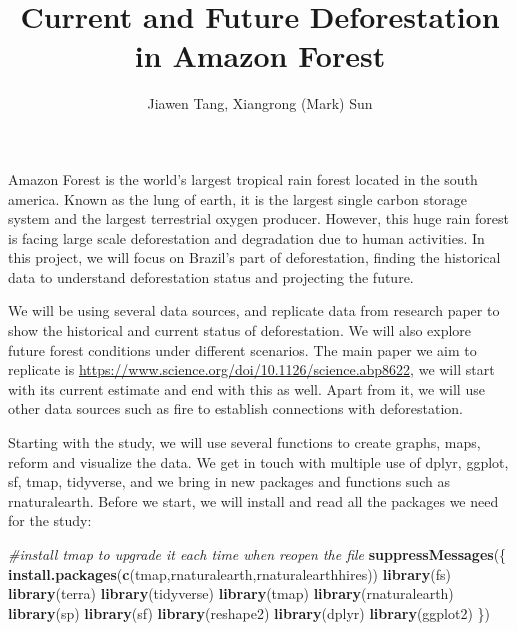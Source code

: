 \documentclass[
]{article}
\title{Current and Future Deforestation in Amazon Forest}
\author{Jiawen Tang, Xiangrong (Mark) Sun}
\date{}
\newenvironment{Shaded}{\begin{snugshade}}{\end{snugshade}}
\newcommand{\CommentTok}[1]{\textcolor[rgb]{0.56,0.35,0.01}{\textit{#1}}}
\newcommand{\FunctionTok}[1]{\textcolor[rgb]{0.13,0.29,0.53}{\textbf{#1}}}
\newcommand{\NormalTok}[1]{#1}
\newcommand{\StringTok}[1]{\textcolor[rgb]{0.31,0.60,0.02}{#1}}
\begin{document}
\maketitle

Amazon Forest is the world's largest tropical rain forest located in the
south america. Known as the lung of earth, it is the largest single
carbon storage system and the largest terrestrial oxygen producer.
However, this huge rain forest is facing large scale deforestation and
degradation due to human activities. In this project, we will focus on
Brazil's part of deforestation, finding the historical data to
understand deforestation status and projecting the future.

We will be using several data sources, and replicate data from research
paper to show the historical and current status of deforestation. We
will also explore future forest conditions under different scenarios.
The main paper we aim to replicate is
\url{https://www.science.org/doi/10.1126/science.abp8622}, we will start
with its current estimate and end with this as well. Apart from it, we
will use other data sources such as fire to establish connections with
deforestation.

Starting with the study, we will use several functions to create graphs,
maps, reform and visualize the data. We get in touch with multiple use
of dplyr, ggplot, sf, tmap, tidyverse, and we bring in new packages and
functions such as rnaturalearth. Before we start, we will install and
read all the packages we need for the study:

\begin{Shaded}
\begin{Highlighting}[]
\CommentTok{\#install tmap to upgrade it each time when reopen the file}
\FunctionTok{suppressMessages}\NormalTok{(\{}
  \FunctionTok{install.packages}\NormalTok{(}\FunctionTok{c}\NormalTok{(}\StringTok{\textquotesingle{}tmap\textquotesingle{}}\NormalTok{,}\StringTok{\textquotesingle{}rnaturalearth\textquotesingle{}}\NormalTok{,}\StringTok{\textquotesingle{}rnaturalearthhires\textquotesingle{}}\NormalTok{))}
  \FunctionTok{library}\NormalTok{(fs)}
  \FunctionTok{library}\NormalTok{(terra)}
  \FunctionTok{library}\NormalTok{(tidyverse)}
  \FunctionTok{library}\NormalTok{(tmap)}
  \FunctionTok{library}\NormalTok{(rnaturalearth)}
  \FunctionTok{library}\NormalTok{(sp)}
  \FunctionTok{library}\NormalTok{(sf)}
  \FunctionTok{library}\NormalTok{(reshape2)}
  \FunctionTok{library}\NormalTok{(dplyr)}
  \FunctionTok{library}\NormalTok{(ggplot2)}
\NormalTok{\})}
\end{Highlighting}
\end{Shaded}
\end{document}

